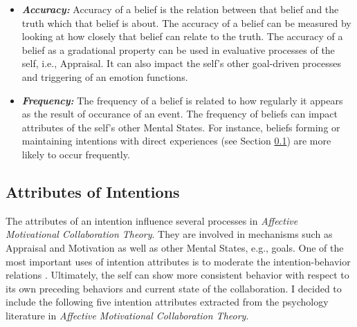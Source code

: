 \documentclass[12pt]{report}
\begin{document}
\begin{itemize}
  \item \textbf{\textit{Accuracy:}} Accuracy of a belief is the relation between
  that belief and the truth which that belief is about. The accuracy of a belief
  can be measured by looking at how closely that belief can relate to the truth.
  The accuracy of a belief as a gradational property can be used in evaluative
  processes of the self, i.e., Appraisal. It can also impact the self's other
  goal-driven processes and triggering of an emotion functions.
  
  \item \textbf{\textit{Frequency:}} The frequency of a belief is related to how
  regularly it appears as the result of occurance of an event. The frequency of
  beliefs can impact attributes of the self's other Mental States. For instance,
  beliefs forming or maintaining intentions with direct experiences (see Section
  \ref{section-intention-attributes}) are more likely to occur frequently.
\end{itemize}

\subsection{Attributes of Intentions}
\label{section-intention-attributes}

The attributes of an intention influence several processes in \textit{Affective
Motivational Collaboration Theory}. They are involved in mechanisms such as
Appraisal and Motivation as well as other Mental States, e.g., goals. One of the
most important uses of intention attributes is to moderate the
intention-behavior relations \cite{cooke:intention-behavior-consistency}.
Ultimately, the self can show more consistent behavior with respect to its own
preceding behaviors and current state of the collaboration. I decided to include
the following five intention attributes extracted from the psychology literature
in \textit{Affective Motivational Collaboration Theory}.
\end{document}
